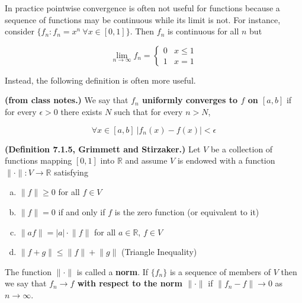 \begin{remark} In practice pointwise convergence is often not useful for functions because a sequence of functions may be continuous while its limit is not. For instance, consider \(\{f_n: f_n = x^n \ \forall x \in [0, 1]\}\). Then \(f_n\) is continuous for all \(n\) but

\[
\lim_{n \to \infty} f_n = \begin{cases}
0 & x \leq 1 \\
1 & x = 1
\end{cases}
\]

Instead, the following definition is often more useful. \end{remark}

\begin{definition} \textbf{(from class notes.)} We say that \textbf{ \(f_n\) \textbf{uniformly converges} to \(f\) on \([a, b]\)} if for every \(\epsilon > 0\) there exists \(N\) such that for every \(n > N\),

\[
\forall x \in [a, b] \ |f_n(x) - f(x)| < \epsilon
\]

\end{definition}

\begin{definition} \textbf{(Definition 7.1.5, Grimmett and Stirzaker.)} Let \(V\) be a collection of functions mapping \([0, 1]\) into \(\mathbb{R}\) and assume \(V\) is endowed with a function \(\lVert \cdot \rVert : V \to \mathbb{R}\) satisfying

\begin{enumerate}[(a)]

\item \(\lVert f \rVert \geq 0\) for all \(f \in V\)

\item \(\lVert f \rVert = 0\) if and only if \(f\) is the zero function (or equivalent to it)

\item \(\lVert af \rVert = |a| \cdot \lVert f \rVert \) for all \(a \in \mathbb{R}\), \(f \in V\)

\item \(\lVert f + g \rVert \leq \lVert f \rVert + \lVert g \rVert \) (Triangle Inequality)

\end{enumerate}

The function \(\lVert \cdot \rVert\) is called a \textbf{norm}. If \(\{f_n\}\) is a sequence of members of \(V\) then we say that \textbf{\(f_n \to f\) with respect to the norm \(\lVert \cdot \rVert\)} if \(\lVert f_n - f \rVert \to 0 \) as \(n \to \infty\).

\end{definition}

